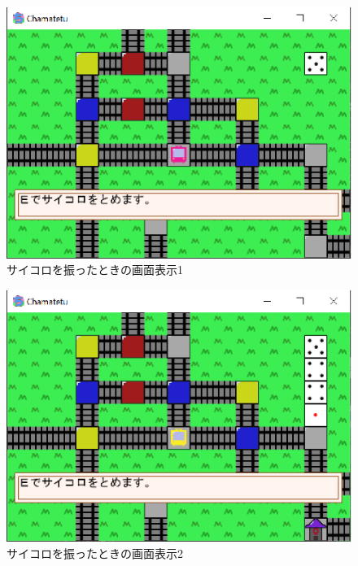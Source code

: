 \documentclass[a4j]{jarticle}
\begin{document}
        \begin{figure}[H]
            \centering
            \includegraphics[scale=1.3]{stopdice.eps}
            \caption{サイコロを振ったときの画面表示1}
             \label{rolldice1}
            \end{figure}   

            \begin{figure}[H]
            \centering
            \includegraphics[scale=1.3]{saikoro4.eps}
            \caption{サイコロを振ったときの画面表示2}
             \label{rolldice2}
            \end{figure}   
\end{document}
